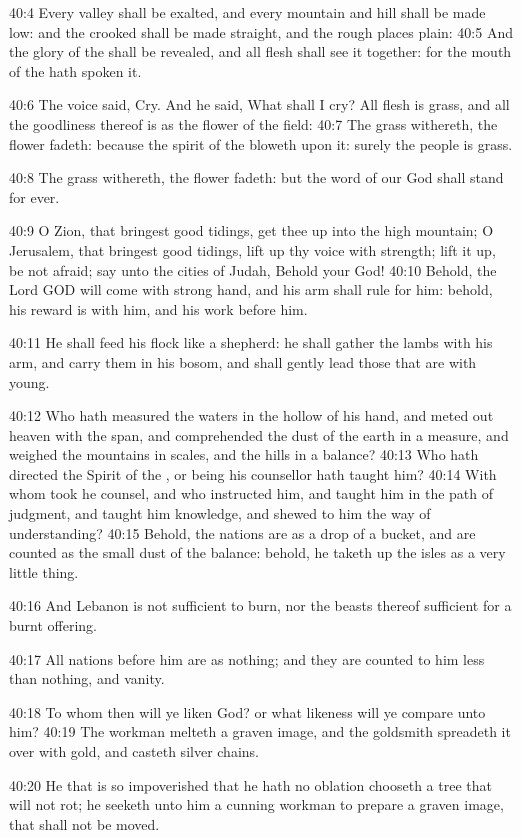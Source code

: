 40:4 Every valley shall be exalted, and every mountain and hill shall
be made low: and the crooked shall be made straight, and the rough
places plain: 40:5 And the glory of the \LORD shall be revealed, and
all flesh shall see it together: for the mouth of the \LORD hath spoken
it.

40:6 The voice said, Cry. And he said, What shall I cry? All flesh is
grass, and all the goodliness thereof is as the flower of the field:
40:7 The grass withereth, the flower fadeth: because the spirit of the
\LORD bloweth upon it: surely the people is grass.

40:8 The grass withereth, the flower fadeth: but the word of our God
shall stand for ever.

40:9 O Zion, that bringest good tidings, get thee up into the high
mountain; O Jerusalem, that bringest good tidings, lift up thy voice
with strength; lift it up, be not afraid; say unto the cities of
Judah, Behold your God!  40:10 Behold, the Lord GOD will come with
strong hand, and his arm shall rule for him: behold, his reward is
with him, and his work before him.

40:11 He shall feed his flock like a shepherd: he shall gather the
lambs with his arm, and carry them in his bosom, and shall gently lead
those that are with young.

40:12 Who hath measured the waters in the hollow of his hand, and
meted out heaven with the span, and comprehended the dust of the earth
in a measure, and weighed the mountains in scales, and the hills in a
balance?  40:13 Who hath directed the Spirit of the \LORD, or being his
counsellor hath taught him?  40:14 With whom took he counsel, and who
instructed him, and taught him in the path of judgment, and taught him
knowledge, and shewed to him the way of understanding?  40:15 Behold,
the nations are as a drop of a bucket, and are counted as the small
dust of the balance: behold, he taketh up the isles as a very little
thing.

40:16 And Lebanon is not sufficient to burn, nor the beasts thereof
sufficient for a burnt offering.

40:17 All nations before him are as nothing; and they are counted to
him less than nothing, and vanity.

40:18 To whom then will ye liken God? or what likeness will ye compare
unto him?  40:19 The workman melteth a graven image, and the goldsmith
spreadeth it over with gold, and casteth silver chains.

40:20 He that is so impoverished that he hath no oblation chooseth a
tree that will not rot; he seeketh unto him a cunning workman to
prepare a graven image, that shall not be moved.

